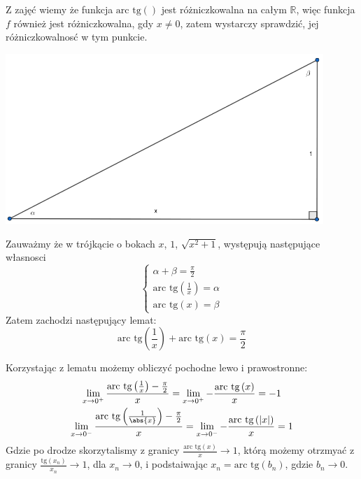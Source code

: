 \documentclass[11pt]{scrartcl}
\begin{document}
  Z zajęć wiemy że funkcja $\text{arc tg} \left (  \right ) $ jest różniczkowalna na całym $\mathbb{R}$, więc funkcja $f$ również jest różniczkowalna, gdy $x \not = 0$, zatem wystarczy sprawdzić, jej różniczkowalnosć w tym punkcie.
  \begin{lemat}
    \hspace{0.5cm}
    \begin{center}
      \includegraphics[width=12cm]{zaddom1}
    \end{center}
    Zauważmy że w trójkącie o bokach $x$, $1$, $\sqrt{x^2 + 1}$, występują następujące własnosci
    \[
        \begin{cases}
            \alpha + \beta = \frac{\pi }{2} \\
            \text{arc tg} \left ( \frac{1}{x} \right ) = \alpha \\
            \text{arc tg} \left ( x \right ) = \beta 
        \end{cases}
    \]
    Zatem zachodzi następujący lemat:
    \[
        \text{arc tg} \left ( \frac{1}{x} \right ) + \text{arc tg} \left ( x \right ) = \frac{\pi }{2}
    \]
  \end{lemat}
  
  Korzystając z lematu możemy obliczyć pochodne lewo i prawostronne:
  \begin{gather*}
      \lim_{x \to 0^+} \frac{\text{arc tg} \left ( \frac{1}{x} \right )  - \frac{\pi }{2}}{x} = \lim_{x \to 0^+} - \frac{\text{arc tg} \left ( x \right ) }{x} = -1 \\
      \lim_{x \to 0^-} \frac{\text{arc tg} \left ( \frac{1}{\abs{x}} \right ) - \frac{\pi }{2}}{x} = \lim_{x \to 0^-} - \frac{\text{arc tg} \left ( |x| \right ) }{x} = 1   
  \end{gather*}
  Gdzie po drodze skorzytalismy z granicy $\frac{\text{arc tg} \left ( x \right ) }{x} \to 1$, którą możemy otrzmyać z granicy $\frac{\text{tg} \left ( x_n \right ) }{x_n} \to 1$, dla $x_n \to 0$, i podstaiwając $x_n = \text{arc tg} \left ( b_n \right ) $, gdzie $b_n \to 0$.
\end{document}
